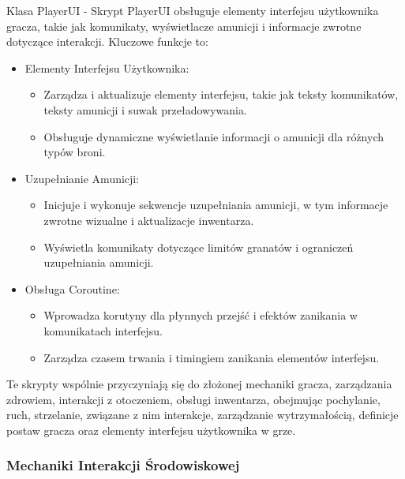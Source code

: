 Klasa PlayerUI -
Skrypt PlayerUI obsługuje elementy interfejsu użytkownika gracza, takie jak komunikaty, wyświetlacze amunicji i informacje zwrotne dotyczące interakcji. Kluczowe funkcje to:
\begin{itemize}
  \item Elementy Interfejsu Użytkownika:
    \begin{itemize}
      \item Zarządza i aktualizuje elementy interfejsu, takie jak teksty komunikatów, teksty amunicji i suwak przeładowywania.
      \item Obsługuje dynamiczne wyświetlanie informacji o amunicji dla różnych typów broni.
    \end{itemize}
  \item Uzupełnianie Amunicji:
    \begin{itemize}
      \item Inicjuje i wykonuje sekwencje uzupełniania amunicji, w tym informacje zwrotne wizualne i aktualizacje inwentarza.
      \item Wyświetla komunikaty dotyczące limitów granatów i ograniczeń uzupełniania amunicji.
    \end{itemize}
  \item Obsługa Coroutine:
    \begin{itemize}
      \item Wprowadza korutyny dla płynnych przejść i efektów zanikania w komunikatach interfejsu.
      \item Zarządza czasem trwania i timingiem zanikania elementów interfejsu.
    \end{itemize}
\end{itemize}

Te skrypty wspólnie przyczyniają się do złożonej mechaniki gracza, zarządzania zdrowiem, interakcji z otoczeniem, obsługi inwentarza, obejmując pochylanie, ruch, strzelanie, związane z nim interakcje, zarządzanie wytrzymałością, definicje postaw gracza oraz elementy interfejsu użytkownika w grze.

\subsubsection{Mechaniki Interakcji Środowiskowej}


